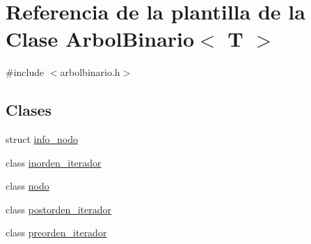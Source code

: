 \hypertarget{classArbolBinario}{}\section{Referencia de la plantilla de la Clase Arbol\+Binario$<$ T $>$}
\label{classArbolBinario}


{\ttfamily \#include $<$arbolbinario.\+h$>$}

\subsection*{Clases}
\begin{DoxyCompactItemize}
\item 
struct \hyperlink{structArbolBinario_1_1info__nodo}{info\+\_\+nodo}
\item 
class \hyperlink{classArbolBinario_1_1inorden__iterador}{inorden\+\_\+iterador}
\item 
class \hyperlink{classArbolBinario_1_1nodo}{nodo}
\item 
class \hyperlink{classArbolBinario_1_1postorden__iterador}{postorden\+\_\+iterador}
\item 
class \hyperlink{classArbolBinario_1_1preorden__iterador}{preorden\+\_\+iterador}
\end{DoxyCompactItemize}
